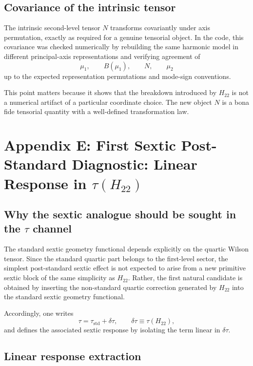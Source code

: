 \documentclass[aip,jcp,reprint,floatfix]{revtex4-2}
\begin{document}
\subsection{Covariance of the intrinsic tensor}

The intrinsic second-level tensor $N$ transforms covariantly under axis
permutation, exactly as required for a genuine tensorial object. In the code,
this covariance was checked numerically by rebuilding the same harmonic model in
different principal-axis representations and verifying agreement of
\begin{equation}
\mu_1,\qquad B(\mu_1),\qquad N,\qquad \mu_2
\end{equation}
up to the expected representation permutations and mode-sign conventions.

This point matters because it shows that the breakdown introduced by $H_{22}$
is not a numerical artifact of a particular coordinate choice. The new object
$N$ is a bona fide tensorial quantity with a well-defined transformation law.

\section{Appendix E: First Sextic Post-Standard Diagnostic: Linear Response in \texorpdfstring{$\tau(H_{22})$}{tau(H22)}}

\subsection{Why the sextic analogue should be sought in the \texorpdfstring{$\tau$}{tau} channel}

The standard sextic geometry functional depends explicitly on the quartic
Wilson tensor. Since the standard quartic part belongs to the first-level
sector, the simplest post-standard sextic effect is not expected to arise from
a new primitive sextic block of the same simplicity as $H_{22}$. Rather, the
first natural candidate is obtained by inserting the non-standard quartic
correction generated by $H_{22}$ into the standard sextic geometry functional.

Accordingly, one writes
\begin{equation}
\tau = \tau_{\mathrm{std}} + \delta\tau,
\qquad
\delta\tau \equiv \tau(H_{22}),
\end{equation}
and defines the associated sextic response by isolating the term linear in
$\delta\tau$.

\subsection{Linear response extraction}
\end{document}
